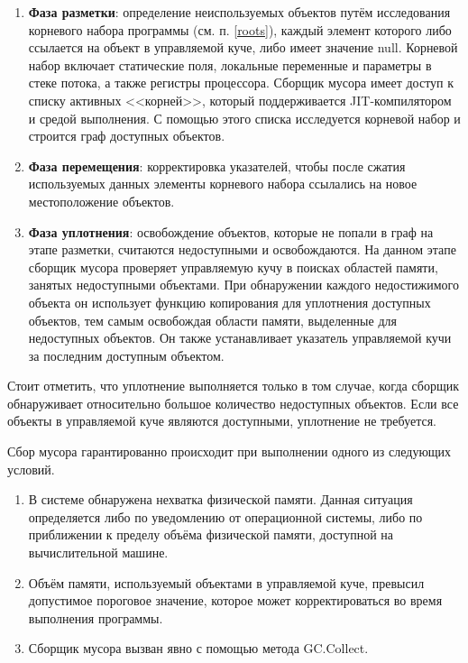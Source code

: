 \begin{enumerate}[label*=\arabic*.]
	\item \textbf{Фаза разметки}: определение неиспользуемых объектов путём исследования корневого набора программы (см. п. \ref{roots}), каждый элемент которого либо ссылается на объект в управляемой куче, либо имеет значение null. Корневой набор включает статические поля, локальные переменные и параметры в стеке потока, а также регистры процессора. Сборщик мусора имеет доступ к списку активных <<корней>>, который поддерживается JIT-компилятором и средой выполнения. С помощью этого списка исследуется корневой набор и строится граф доступных объектов.
	\item \textbf{Фаза перемещения}: корректировка указателей, чтобы после сжатия используемых данных элементы корневого набора ссылались на новое местоположение объектов.
	\item \textbf{Фаза уплотнения}: освобождение объектов, которые не попали в граф на этапе разметки, считаются недоступными и освобождаются. На данном этапе сборщик мусора проверяет управляемую кучу в поисках областей памяти, занятых недоступными объектами. При обнаружении каждого недостижимого объекта он использует функцию копирования для уплотнения доступных объектов, тем самым освобождая области памяти, выделенные для недоступных объектов. Он также устанавливает указатель управляемой кучи за последним доступным объектом. 
\end{enumerate}

Стоит отметить, что уплотнение выполняется только в том случае, когда сборщик обнаруживает относительно большое количество недоступных объектов. Если все объекты в управляемой куче являются доступными, уплотнение не требуется. \cite{dotnet_gc}

Сбор мусора гарантированно происходит при выполнении одного из следующих условий. \cite{dotnet_gc}

\begin{enumerate}[label*=\arabic*.]
	\item В системе обнаружена нехватка физической памяти. Данная ситуация определяется либо по уведомлению от операционной системы, либо по приближении к пределу объёма физической памяти, доступной на вычислительной машине.
	\item Объём памяти, используемый объектами в управляемой куче, превысил допустимое пороговое значение, которое может корректироваться во время выполнения программы.
	\item Сборщик мусора вызван явно с помощью метода GC.Collect.
\end{enumerate}

